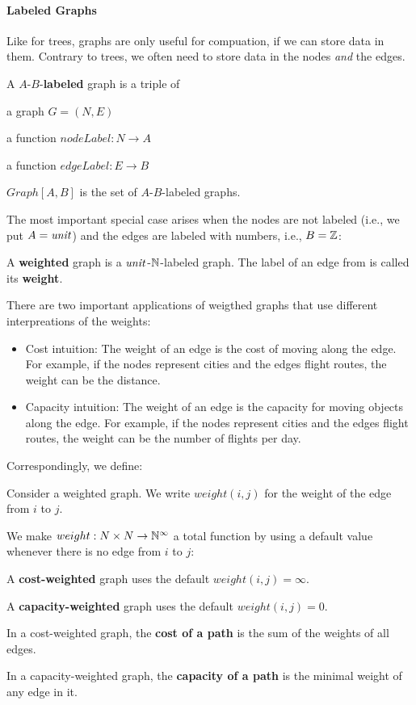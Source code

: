 \paragraph{Labeled Graphs}
Like for trees, graphs are only useful for compuation, if we can store data in them.
Contrary to trees, we often need to store data in the nodes \emph{and} the edges.

\begin{definition}
A $A$-$B$-\textbf{labeled} graph is a triple of
\begin{compactitem}
 \item a graph $G=(N,E)$
 \item a function $nodeLabel:N\to A$
 \item a function $edgeLabel:E\to B$
\end{compactitem}
$Graph[A,B]$ is the set of $A$-$B$-labeled graphs.
\end{definition}

The most important special case arises when the nodes are not labeled (i.e., we put $A=\mathit{unit}$) and the edges are labeled with numbers, i.e., $B=\mathbb{Z}$:

\begin{definition}
A \textbf{weighted} graph is a $\mathit{unit}$-$\mathbb{N}$-labeled graph.
The label of an edge from is called its \textbf{weight}.
\end{definition}

There are two important applications of weigthed graphs that use different interpreations of the weights:
\begin{itemize}
 \item Cost intuition: The weight of an edge is the cost of moving along the edge.
 For example, if the nodes represent cities and the edges flight routes, the weight can be the distance.
 \item Capacity intuition: The weight of an edge is the capacity for moving objects along the edge.
 For example, if the nodes represent cities and the edges flight routes, the weight can be the number of flights per day.
\end{itemize}

Correspondingly, we define:
\begin{definition}
Consider a weighted graph.
We write $weight(i,j)$ for the weight of the edge from $i$ to $j$.

We make $weight:N\times N\to \mathbb{N}^\infty$ a total function by using a default value whenever there is no edge from $i$ to $j$:
\begin{compactitem}
 \item A \textbf{cost-weighted} graph uses the default $weight(i,j)=\infty$.
 \item A \textbf{capacity-weighted} graph uses the default $weight(i,j)=0$.
\end{compactitem}

In a cost-weighted graph, the \textbf{cost of a path} is the sum of the weights of all edges.

In a capacity-weighted graph, the \textbf{capacity of a path} is the minimal weight of any edge in it.
\end{definition}


